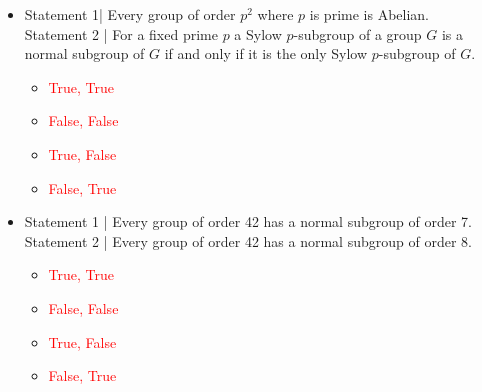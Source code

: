     

\begin{example}\label{def:false-positive-example}
\begin{itemize}
    \item Statement 1| Every group of order \( p^2 \) where \( p \) is prime is Abelian. \\
    Statement 2 | For a fixed prime \( p \) a Sylow \( p \)-subgroup of a group \( G \) is a normal subgroup of \( G \) if and only if it is the only Sylow \( p \)-subgroup of \( G \).
    \begin{itemize}[noitemsep]
        \item[\textcolor{red}{A.}] \textcolor{red}{True, True}
        \item[\textcolor{red}{B.}] \textcolor{red}{False, False}
        \item[\textcolor{red}{C.}] \textcolor{red}{True, False}
        \item[\textcolor{red}{D.}] \textcolor{red}{False, True}
    \end{itemize}
    

    \item Statement 1 | Every group of order 42 has a normal subgroup of order 7. \\
    Statement 2 | Every group of order 42 has a normal subgroup of order 8.
    \begin{itemize}[noitemsep]
        \item[\textcolor{red}{A.}] \textcolor{red}{True, True}
        \item[\textcolor{red}{B.}] \textcolor{red}{False, False}
        \item[\textcolor{red}{C.}] \textcolor{red}{True, False}
        \item[\textcolor{red}{D.}] \textcolor{red}{False, True}
    \end{itemize}
\end{itemize}

\end{example}

